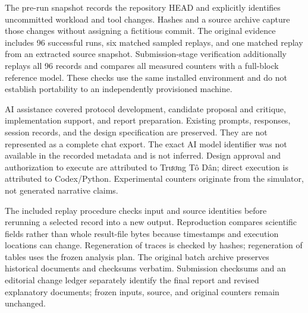 \documentclass[11pt,a4paper]{article}
\begin{document}
The pre-run snapshot records the repository HEAD and explicitly identifies uncommitted workload and tool changes. Hashes and a source archive capture those changes without assigning a fictitious commit. The original evidence includes 96 successful runs, six matched sampled replays, and one matched replay from an extracted source snapshot. Submission-stage verification additionally replays all 96 records and compares all measured counters with a full-block reference model. These checks use the same installed environment and do not establish portability to an independently provisioned machine.



AI assistance covered protocol development, candidate proposal and critique, implementation support, and report preparation. Existing prompts, responses, session records, and the design specification are preserved. They are not represented as a complete chat export. The exact AI model identifier was not available in the recorded metadata and is not inferred. Design approval and authorization to execute are attributed to Trương Tô Dân; direct execution is attributed to Codex/Python. Experimental counters originate from the simulator, not generated narrative claims.

The included replay procedure checks input and source identities before rerunning a selected record into a new output. Reproduction compares scientific fields rather than whole result-file bytes because timestamps and execution locations can change. Regeneration of traces is checked by hashes; regeneration of tables uses the frozen analysis plan. The original batch archive preserves historical documents and checksums verbatim. Submission checksums and an editorial change ledger separately identify the final report and revised explanatory documents; frozen inputs, source, and original counters remain unchanged.
\end{document}
